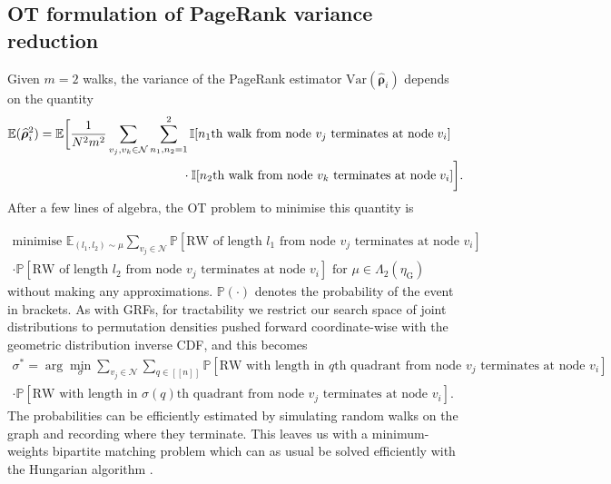 \subsection{OT formulation of PageRank variance reduction}
 Given $m=2$ walks, the variance of the PageRank estimator $\textrm{Var}(\widehat{\boldsymbol{\rho}}_i)$  depends on the quantity
 \small
 \begin{equation}
 \begin{multlined}
     \mathbb{E}(\widehat{\boldsymbol{\rho}}_i^2) = \mathbb{E} \bigg[ \frac{1}{N^2m^2} \sum_{v_j, v_k \in \mathcal{N}} \sum_{n_1, n_2=1}^2 \mathbb{I} [ n_1\textrm{th walk from node } v_j\textrm{ terminates at node} \hspace{1mm} v_i] \bigg.
     \\ \bigg.  \cdot  \mathbb{I} [ n_2\textrm{th walk from node } v_k\textrm{ terminates at node} \hspace{1mm} v_i] \bigg].
 \end{multlined}
 \end{equation}
 \normalsize
 After a few lines of algebra, the OT problem to minimise this quantity is 

\small
 \begin{equation} 
 \begin{multlined}
    \textrm{minimise } \mathbb{E}_{(l_1,l_2) \sim \mu} \sum_{v_j \in \mathcal{N}} \mathbb{P}[\textrm{RW of length $l_1$ from node $v_j$ terminates at node $v_i$}]
    \\ \cdot \mathbb{P}[\textrm{RW of length $l_2$ from node $v_j$ terminates at node $v_i$}] \textrm{ for } {\mu \in \Lambda_2(\eta_\textrm{G})}
\end{multlined}
\end{equation}
\normalsize
without making any approximations. 
$\mathbb{P}(\cdot)$ denotes the probability of the event in brackets.
As with GRFs, for tractability we restrict our search space of joint distributions to permutation densities pushed forward coordinate-wise with the geometric distribution inverse CDF, and this becomes
\small
\begin{equation} \label{eq:matching_pagerank}
\begin{multlined}
    \sigma^* = \arg \min_{\sigma} \sum_{v_j \in \mathcal{N}} \sum_{q \in [\![n]\!]} \mathbb{P}[\textrm{RW with length in $q$th quadrant from node $v_j$ terminates at node $v_i$}]
    \\ \cdot \mathbb{P}[\textrm{RW with length in $\sigma(q)$th quadrant from node $v_j$ terminates at node $v_i$}]. 
\end{multlined}
\end{equation}
\normalsize
The probabilities can be efficiently estimated by simulating random walks on the graph and recording where they terminate. 
This leaves us with a minimum-weights bipartite matching problem which can as usual be solved efficiently with the Hungarian algorithm \citep{kuhn1955hungarian}.

